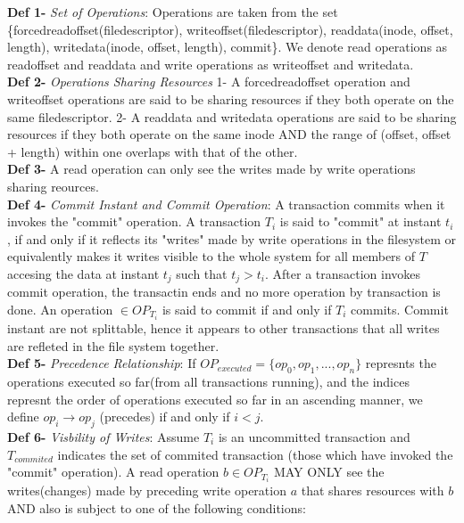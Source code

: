 \documentclass[a4paper, 11pt]{article}
\begin{document}
\textbf{Def 1-} \emph{Set of Operations}: Operations are taken from the set \{forcedreadoffset(filedescriptor), writeoffset(filedescriptor), readdata(inode, offset, length), writedata(inode, offset, length), commit\}. We denote read operations as readoffset and readdata and write operations as writeoffset and writedata.\\

\textbf{Def 2-} \emph{Operations Sharing Resources} 1- A forcedreadoffset operation and writeoffset operations are said to be sharing resources if they both operate on the same filedescriptor. 2- A readdata and writedata operations are said to be sharing resources if they both operate on the same inode AND the range of (offset, offset + length) within one overlaps with that of the other.\\ 

\textbf{Def 3-} A read operation can only see the writes made by write operations sharing reources.\\ 

\textbf{Def 4-} \emph{Commit Instant and Commit Operation}: A transaction commits when it invokes the "commit" operation. A transaction $T_i$ is said to "commit" at instant $t_i$, if and only if it reflects its "writes" made by write operations in the filesystem or equivalently makes it writes visible to the whole system for all members of $T$ accesing the data at instant $t_j$ such that $t_j > t_i$. After a transaction invokes commit operation, the transactin ends and no more operation by transaction is done. An operation $\in OP_{T_i}$ is said to commit if and only if $T_i$ commits. Commit instant are not splittable, hence it appears to other transactions that all writes are refleted in the file system together.\\ 

\textbf{Def 5-} \emph{Precedence Relationship}: If $OP_{executed} = \{op_0, op_1, ..., op_n\}$ represnts the operations executed so far(from all transactions running), and the indices represnt the order of operations executed so far in an ascending manner, we define $op_i \rightarrow op_j$ (precedes) if and only if $i<j$.\\ 

\textbf{Def 6-} \emph{Visbility of Writes}: Assume $T_i$ is an uncommitted transaction and $T_{commited}$ indicates the set of commited transaction (those which have invoked the "commit" operation). A read operation $b \in OP_{T_i}$ MAY ONLY see the writes(changes) made by preceding write operation $a$ that shares resources with $b$ AND also is subject to one of the following conditions:\\
\end{document}
